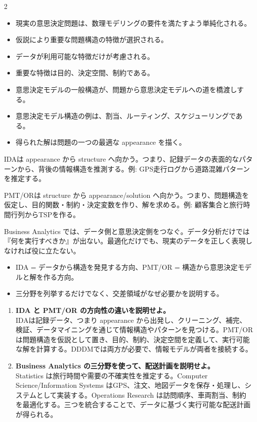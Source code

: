 \clearpage
{}
\begin{multicols}{2}\footnotesize\raggedcolumns
{}
\begin{itemize}
\item 現実の意思決定問題は、数理モデリングの要件を満たすよう単純化される。
\item 仮説により重要な問題構造の特徴が選択される。
\item データが利用可能な特徴だけが考慮される。
\item 重要な特徴は目的、決定空間、制約である。
\item 意思決定モデルの一般構造が、問題から意思決定モデルへの道を橋渡しする。
\item 意思決定モデル構造の例は、割当、ルーティング、スケジューリングである。
\item 得られた解は問題の一つの最適な appearance を描く。
\end{itemize}
IDAは appearance から structure へ向かう。つまり、記録データの表面的なパターンから、背後の情報構造を推測する。例: GPS走行ログから道路混雑パターンを推定する。\par

PMT/ORは structure から appearance/solution へ向かう。つまり、問題構造を仮定し、目的関数・制約・決定変数を作り、解を求める。例: 顧客集合と旅行時間行列からTSPを作る。\par

Business Analytics では、データ側と意思決定側をつなぐ。データ分析だけでは『何を実行すべきか』が出ない。最適化だけでも、現実のデータを正しく表現しなければ役に立たない。\par
{}
\begin{itemize}
\item IDA = データから構造を発見する方向、PMT/OR = 構造から意思決定モデルと解を作る方向。
\item 三分野を列挙するだけでなく、交差領域がなぜ必要かを説明する。
\end{itemize}
\begin{enumerate}
\item \textbf{IDA と PMT/OR の方向性の違いを説明せよ。}\\IDAは記録データ、つまり appearance から出発し、クリーニング、補完、検証、データマイニングを通じて情報構造やパターンを見つける。PMT/ORは問題構造を仮説として置き、目的、制約、決定空間を定義して、実行可能な解を計算する。DDDMでは両方が必要で、情報モデルが両者を接続する。
\item \textbf{Business Analytics の三分野を使って、配送計画を説明せよ。}\\Statistics は旅行時間や需要の不確実性を推定する。Computer Science/Information Systems はGPS、注文、地図データを保存・処理し、システムとして実装する。Operations Research は訪問順序、車両割当、制約を最適化する。三つを統合することで、データに基づく実行可能な配送計画が得られる。
\end{enumerate}
\end{multicols}

